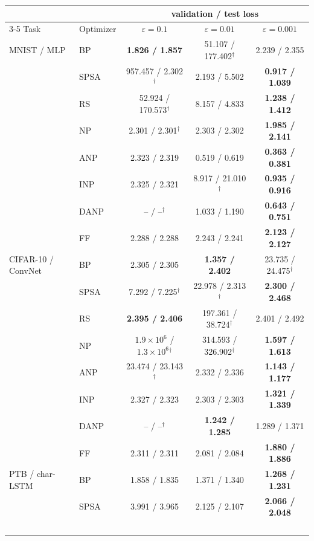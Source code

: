 \begin{tabular}{ll ccc}
\toprule
 & & \multicolumn{3}{c}{validation / test loss} \\
\cmidrule(lr){3-5}
Task & Optimizer & $\varepsilon=0.1$ & $\varepsilon=0.01$ & $\varepsilon=0.001$ \\
\midrule
MNIST / MLP & BP & \textbf{1.826 / 1.857} & 51.107 / 177.402$^\dagger$ & 2.239 / 2.355 \\
 & SPSA & 957.457 / 2.302$^\dagger$ & 2.193 / 5.502 & \textbf{0.917 / 1.039} \\
 & RS & 52.924 / 170.573$^\dagger$ & 8.157 / 4.833 & \textbf{1.238 / 1.412} \\
 & NP & 2.301 / 2.301$^\dagger$ & 2.303 / 2.302 & \textbf{1.985 / 2.141} \\
 & ANP & 2.323 / 2.319 & 0.519 / 0.619 & \textbf{0.363 / 0.381} \\
 & INP & 2.325 / 2.321 & 8.917 / 21.010$^\dagger$ & \textbf{0.935 / 0.916} \\
 & DANP & -- / --$^\dagger$ & 1.033 / 1.190 & \textbf{0.643 / 0.751} \\
 & FF & 2.288 / 2.288 & 2.243 / 2.241 & \textbf{2.123 / 2.127} \\
\midrule
CIFAR-10 / ConvNet & BP & 2.305 / 2.305 & \textbf{1.357 / 2.402} & 23.735 / 24.475$^\dagger$ \\
 & SPSA & 7.292 / 7.225$^\dagger$ & 22.978 / 2.313$^\dagger$ & \textbf{2.300 / 2.468} \\
 & RS & \textbf{2.395 / 2.406} & 197.361 / 38.724$^\dagger$ & 2.401 / 2.492 \\
 & NP & $1.9{\times}10^{6}$ / $1.3{\times}10^{6}$$^\dagger$ & 314.593 / 326.902$^\dagger$ & \textbf{1.597 / 1.613} \\
 & ANP & 23.474 / 23.143$^\dagger$ & 2.332 / 2.336 & \textbf{1.143 / 1.177} \\
 & INP & 2.327 / 2.323 & 2.303 / 2.303 & \textbf{1.321 / 1.339} \\
 & DANP & -- / --$^\dagger$ & \textbf{1.242 / 1.285} & 1.289 / 1.371 \\
 & FF & 2.311 / 2.311 & 2.081 / 2.084 & \textbf{1.880 / 1.886} \\
\midrule
PTB / char-LSTM & BP & 1.858 / 1.835 & 1.371 / 1.340 & \textbf{1.268 / 1.231} \\
 & SPSA & 3.991 / 3.965 & 2.125 / 2.107 & \textbf{2.066 / 2.048} \\
$$
\end{tabular}
